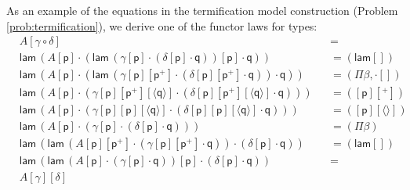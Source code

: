 \documentclass[submission,copyright,creativecommons]{eptcs}
\newcommand{\p}{\mathsf{p}}
\newcommand{\q}{\mathsf{q}}
\newcommand{\lam}{\mathsf{lam}}
\begin{document}
As an example of the equations in the termification model construction
(Problem \ref{prob:termification}), we derive one of the functor laws
for types:
\begin{equation*}
\begin{alignedat}{10}
  & A[\gamma\circ\delta] && {=} \\
  & \lam\,(A[\p]\cdot(\lam\,(\gamma[\p]\cdot(\delta[\p]\cdot\q))[\p]\cdot\q)) && {=}(\lam[]) \\
  & \lam\,(A[\p]\cdot(\lam\,(\gamma[\p][\p^+]\cdot(\delta[\p][\p^+]\cdot\q))\cdot\q)) && {=}(\Pi\beta, {\cdot}[]) \\
  & \lam\,(A[\p]\cdot(\gamma[\p][\p^+][\langle\q\rangle]\cdot(\delta[\p][\p^+][\langle\q\rangle]\cdot\q))) && {=}([\p][^+]) \\
  & \lam\,(A[\p]\cdot(\gamma[\p][\p][\langle\q\rangle]\cdot(\delta[\p][\p][\langle\q\rangle]\cdot\q))) && {=}([\p][\langle\rangle]) \\
  & \lam\,(A[\p]\cdot(\gamma[\p]\cdot(\delta[\p]\cdot\q))) && {=}(\Pi\beta) \\
  & \lam\,(\lam\,(A[\p][\p^+]\cdot(\gamma[\p][\p^+]\cdot\q))\cdot(\delta[\p]\cdot\q))\,\, && {=}(\lam[]) \\
  & \lam\,(\lam\,(A[\p]\cdot(\gamma[\p]\cdot\q))[\p]\cdot(\delta[\p]\cdot\q)) && {=} \\
  & A[\gamma][\delta]
\end{alignedat}
\end{equation*}
\end{document}
